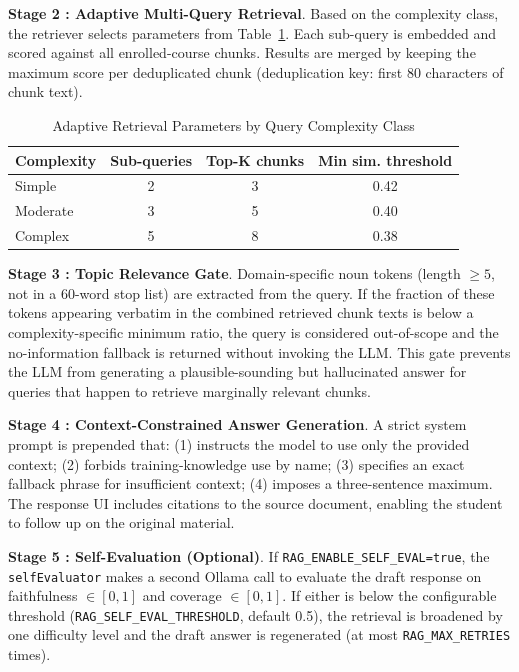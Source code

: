 \documentclass[12pt,a4paper]{report}
\begin{document}
\textbf{Stage 2 : Adaptive Multi-Query Retrieval}. Based on the complexity class, the retriever selects parameters from Table~\ref{tab:retrieval}. Each sub-query is embedded and scored against all enrolled-course chunks. Results are merged by keeping the maximum score per deduplicated chunk (deduplication key: first 80 characters of chunk text).

\begin{table}[htbp]
\caption{Adaptive Retrieval Parameters by Query Complexity Class}
\label{tab:retrieval}
\centering
\small
\begin{tabular}{|l|c|c|c|}
\hline
\textbf{Complexity} & \textbf{Sub-queries} & \textbf{Top-K chunks} & \textbf{Min sim. threshold} \\
\hline
Simple & 2 & 3 & 0.42 \\
Moderate & 3 & 5 & 0.40 \\
Complex & 5 & 8 & 0.38 \\
\hline
\end{tabular}
\end{table}

\textbf{Stage 3 : Topic Relevance Gate}. Domain-specific noun tokens (length $\geq 5$, not in a 60-word stop list) are extracted from the query. If the fraction of these tokens appearing verbatim in the combined retrieved chunk texts is below a complexity-specific minimum ratio, the query is considered out-of-scope and the no-information fallback is returned without invoking the LLM. This gate prevents the LLM from generating a plausible-sounding but hallucinated answer for queries that happen to retrieve marginally relevant chunks.

\textbf{Stage 4 : Context-Constrained Answer Generation}. A strict system prompt is prepended that: (1) instructs the model to use only the provided context; (2) forbids training-knowledge use by name; (3) specifies an exact fallback phrase for insufficient context; (4) imposes a three-sentence maximum. The response UI includes citations to the source document, enabling the student to follow up on the original material.

\textbf{Stage 5 : Self-Evaluation (Optional)}. If \texttt{RAG\_ENABLE\_SELF\_EVAL=true}, the \texttt{selfEvaluator} makes a second Ollama call to evaluate the draft response on faithfulness $\in [0,1]$ and coverage $\in [0,1]$. If either is below the configurable threshold (\texttt{RAG\_SELF\_EVAL\_THRESHOLD}, default 0.5), the retrieval is broadened by one difficulty level and the draft answer is regenerated (at most \texttt{RAG\_MAX\_RETRIES} times).
\end{document}
